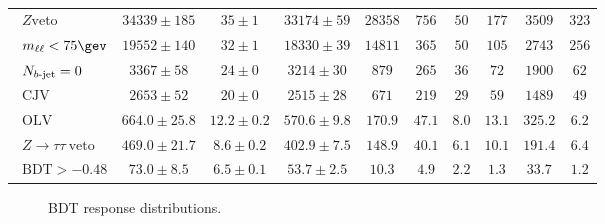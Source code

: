 \begin{table}[h!]
\begin{center}
{\begin{tabular}{l || c c c | c c c c c c }
\ $Z \textrm{veto}$ & $34339 \pm 185$ & $35 \pm 1$ & $33174 \pm 59$ &
$28358$ & $756$ & $50$ & $177$ & $3509$ & $323$ \\
\ $\mll < 75 \gev$ & $19552 \pm 140$ & $32 \pm 1$ & $18330 \pm 39$ &
$14811$ & $365$ & $50$ & $105$ & $2743$ & $256$ \\
\ $N_{b\textrm{-jet}} = 0$ & $3367 \pm 58$ & $24 \pm 0$ & $3214 \pm 30$ & $879$ &
$265$ & $36$ & $72$ & $1900$ & $62$ \\
\ $\textrm{CJV}$ & $2653 \pm 52$ & $20 \pm 0$ & $2515 \pm 28$ & $671$ &
$219$ & $29$ & $59$ & $1489$ & $49$ \\
\ $\textrm{OLV}$ & $664.0 \pm 25.8$ & $12.2 \pm 0.2$ & $570.6 \pm 9.8$ &
$170.9$ & $47.1$ & $8.0$ & $13.1$ & $325.2$ & $6.2$ \\
\ $Z\rightarrow{\tau\tau}~\textrm{veto}$ & $469.0 \pm 21.7$ & $8.6 \pm
0.2$ & $402.9 \pm 7.5$ & $148.9$ & $40.1$ & $6.1$ & $10.1$ & $191.4$ &
$6.4$ \\
\hline
\ $\textrm{BDT} > -0.48$ & $73.0 \pm 8.5$ & $6.5 \pm 0.1$ & $53.7 \pm
2.5$ & $10.3$ & $4.9$ & $2.2$ & $1.3$ & $33.7$ & $1.2$ \\
\hline
\end{tabular}
}
\caption[]{}
\label{chap:analysis:tab:signl_region_cutflow}
\end{center}
\end{table}


\begin{figure}[h!]
    \centering
    \caption[BDT response distributions.]{BDT response distributions.}
\label{chap:analysis:fig:bdt_response}
\end{figure}

